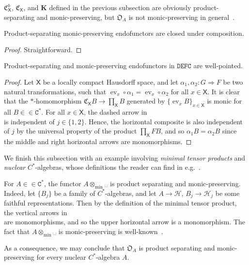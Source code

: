 \documentclass[10pt]{simplearticle}
\newcommand{\tikzinput}[1]{}
\newcommand{\ev}{\operatorname{ev}}
\newcommand{\DEFC}{\mathbb{\mathtt{DEFC}}}
\newcommand{\Cstar}{\mathtt{C^{*}}}
\newcommand{\C}{\mathfrak{C}^{\,}}
\newcommand{\mmph}{\text{{␣}}}
\newcommand{\fK}{\mathbf{K}}
\begin{document}
\begin{example}
$\mathfrak{C}^{b}_{\mathsf{X}}$, $\C_{\mathsf{X}}$, and $\fK$ defined
in the previous subsection are obviously product-separating and monic-preserving,
but $\mathfrak{O}_{A}$ is not monic-preserving in general~\cite[p.~254]{Ped_pullback99}.
\end{example}

\begin{lem}
Product-separating monic-preserving endofunctors are closed under
composition.
\end{lem}

\begin{proof}
Straightforward.
\end{proof}

\begin{lem}\label{lem:eval-at-dense}
Product-separating and monic-preserving
endofunctors in $\DEFC$ are well-pointed.
\end{lem}

\begin{proof}
Let $\mathsf{X}$ be a locally compact Hausdorff space, and let $\alpha_{1},\alpha_{2}\colon G\Rightarrow F$
be two natural transformations, such that $\ev_{x}\circ\alpha_{1}=\ev_{x}\circ\alpha_{2}$
for all $x\in\mathsf{X}$. It is clear that the $*$-homomorphism
$\C_{\mathsf{X}}B\to\prod_{\mathsf{X}}B$ generated by $\{\ev_{x}B\}_{x\in\mathsf{X}}$
is monic for all $B\in\in\Cstar$. For all $x\in\mathsf{X}$, the
dashed arrow in
\[
\tikzinput{d365}
\]
is independent of $j\in\{1,2\}$. Hence, the horizontal composite
is also independent of $j$ by the universal property of the product
$\prod_{\mathsf{X}}FB$, and so $\alpha_{1}B=\alpha_{2}B$ since the
middle and right horizontal arrows are monomorphisms.
\end{proof}

We finish this subsection with an example involving \emph{minimal
tensor products} and \emph{nuclear} $C^{*}$-algebras, whose definitions
the reader can find in e.g.~\cite{murphy1990}.
\begin{example}
For $A\in\in\Cstar$, the functor $A\otimes_{\min}\mmph$ is product
separating and monic-preserving. Indeed, let $\{B_{j}\}$ be a family
of $C^{*}$-algebras, and let $A\to\mathcal{H}$, $B_{j}\to\mathcal{H}_{j}$
be some faithful representations. Then by the definition of the minimal
tensor product, the vertical arrows in
\[
\tikzinput{d348}
\]
 are monomorphisms, and so the upper horizontal arrow is a monomorphism.
The fact that $A\otimes_{\min}\mmph$ is monic-preserving is well-known~\cite{Ped_pullback99}.

As a consequence, we may conclude that $\mathfrak{O}_{A}$ is product
separating and monic-preserving for every nuclear $C^{*}$-algebra
$A$.
\end{example}
\end{document}
